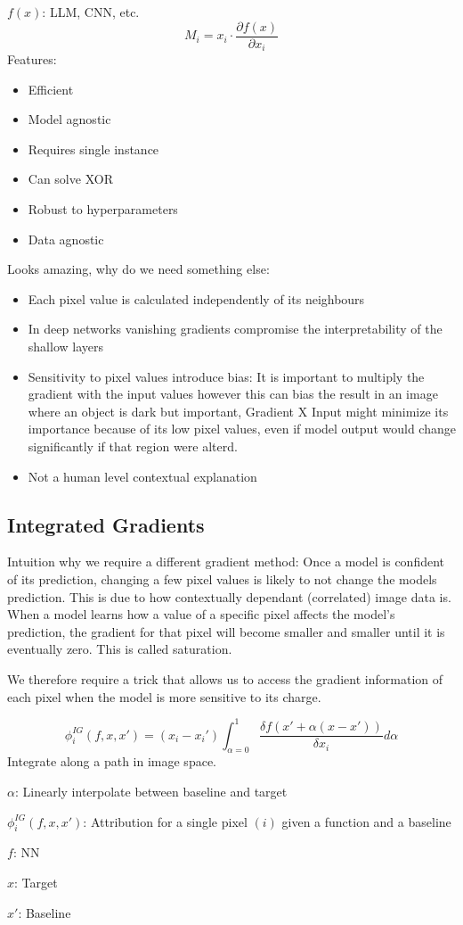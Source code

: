 \(f(x)\): LLM, CNN, etc.
\[
M_i = x_i \cdot \frac{\partial f(x)}{\partial x_i}
\]
Features:
\begin{itemize}
    \item Efficient
    \item Model agnostic
    \item Requires single instance
    \item Can solve XOR
    \item Robust to hyperparameters
    \item Data agnostic
\end{itemize}
Looks amazing, why do we need something else:
\begin{itemize}
    \item Each pixel value is calculated independently of its neighbours
    \item In deep networks vanishing gradients compromise the interpretability of the shallow layers
    \item Sensitivity to pixel values introduce bias:
    It is important to multiply the gradient with the input values however this can bias the result in an image where an object is dark but important, Gradient X Input might minimize its importance because of its low pixel values, even if model output would change significantly if that region were alterd.
    \item Not a human level contextual explanation
\end{itemize}
\subsection{Integrated Gradients}
Intuition why we require a different gradient method:
Once a model is confident of its prediction, changing a few pixel values is likely to not change the models prediction.
This is due to how contextually dependant (correlated) image data is.
When a model learns how a value of a specific pixel affects the model's prediction, the gradient for that pixel will become smaller and smaller until it is eventually zero. This is called saturation.

We therefore require a trick that allows us to access the gradient information of each pixel when the model is more sensitive to its charge.

\[
\phi_i^{IG}(f,x,x') = (x_i - x_i')\int_{\alpha = 0}^{1} \frac{\delta f(x' + \alpha(x - x'))}{\delta x_i}d\alpha
\]
Integrate along a path in image space.

\(\alpha\): Linearly interpolate between baseline and target

\(\phi_i^{IG}(f,x,x')\): Attribution for a single pixel \((i )\) given a function and a baseline

\(f\): NN 

\(x\): Target

\(x'\): Baseline 
